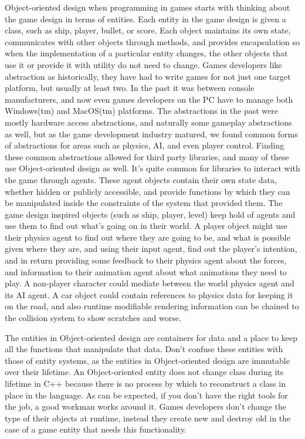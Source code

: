 Object-oriented design when programming in games starts with thinking about the
game design in terms of entities. Each entity in the game design is given a
class, such as ship, player, bullet, or score. Each object maintains its own
state, communicates with other objects through methods, and provides
encapsulation so when the implementation of a particular entity changes, the
other objects that use it or provide it with utility do not need to change.
Games developers like abstraction as historically, they have had to write games
for not just one target platform, but usually at least two. In the past it was
between console manufacturers, and now even games developers on the PC have to
manage both Windows(tm) and MacOS(tm) platforms. The abstractions in the past
were mostly hardware access abstractions, and naturally some gameplay
abstractions as well, but as the game development industry matured, we found
common forms of abstractions for areas such as physics, AI, and even player
control. Finding these common abstractions allowed for third party libraries,
and many of these use Object-oriented design as well. It's quite common for
libraries to interact with the game through agents. These agent objects contain
their own state data, whether hidden or publicly accessible, and provide
functions by which they can be manipulated inside the constraints of the system
that provided them. The game design inspired objects (such as ship, player,
level) keep hold of agents and use them to find out what's going on in their
world. A player object might use their physics agent to find out where they are
going to be, and what is possible given where they are, and using their input
agent, find out the player's intention, and in return providing some feedback
to their physics agent about the forces, and information to their animation
agent about what animations they need to play. A non-player character could
mediate between the world physics agent and its AI agent. A car object could
contain references to physics data for keeping it on the road, and also runtime
modifiable rendering information can be chained to the collision system to show
scratches and worse.

The entities in Object-oriented design are containers for data and a place to
keep all the functions that manipulate that data. Don't confuse these entities
with those of entity systems, as the entities in Object-oriented design are
immutable over their lifetime. An Object-oriented entity does not change class
during its lifetime in C++ because there is no process by which to reconstruct
a class in place in the language. As can be expected, if you don't have the
right tools for the job, a good workman works around it. Games developers don't
change the type of their objects at runtime, instead they create new and
destroy old in the case of a game entity that needs this functionality.

